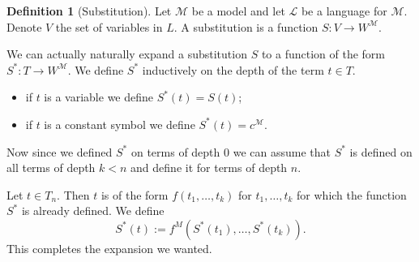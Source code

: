 \documentclass[11pt,a4paper]{article}
\theoremstyle{definition}
\newtheorem{definition}{Definition}[section]
\theoremstyle{plain}
\newcommand{\M}{\mathcal{M}}
\renewcommand{\L}{\mathcal{L}}
\begin{document}
  \begin{definition}[Substitution]
    Let $\M$ be a model and let $\L$ be a language for $\M$.
    Denote $V$ the set of variables in $L$.
    A substitution is a function $S \colon V \to W^\M$.
  \end{definition}

  We can actually naturally expand a substitution $S$ to a function of
  the form $S^* \colon T \to W^\M$.
  We define $S^*$ inductively on the depth of the term $t \in T$.
  \begin{itemize}
    \item if $t$ is a variable we define $S^*(t) = S(t)$;
    \item if $t$ is a constant symbol we define $S^*(t) = c^\M$.
  \end{itemize}
  Now since we defined $S^*$ on terms of depth $0$ we can assume that $S^*$
  is defined on all terms of depth $k < n$ and define it for terms of depth
  $n$.

  Let $t \in T_n$. Then $t$ is of the form $f(t_1,\dots,t_k)$ for
  $t_1,\dots,t_k$ for which the function $S^*$ is already defined.
  We define
  \[
    S^*(t) := f^M(S^*(t_1),\dots,S^*(t_k)).
  \]
  This completes the expansion we wanted.
\end{document}
